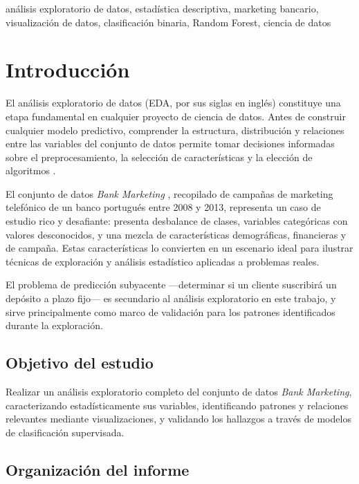 \documentclass[conference]{IEEEtran}
\begin{document}
\begin{IEEEkeywords}
análisis exploratorio de datos, estadística descriptiva, marketing bancario, visualización de datos, clasificación binaria, Random Forest, ciencia de datos
\end{IEEEkeywords}

\section{Introducción}

El análisis exploratorio de datos (EDA, por sus siglas en inglés) constituye una etapa fundamental en cualquier proyecto de ciencia de datos. Antes de construir cualquier modelo predictivo, comprender la estructura, distribución y relaciones entre las variables del conjunto de datos permite tomar decisiones informadas sobre el preprocesamiento, la selección de características y la elección de algoritmos \cite{tukey1977}.

El conjunto de datos \textit{Bank Marketing} \cite{uci_bank}, recopilado de campañas de marketing telefónico de un banco portugués entre 2008 y 2013, representa un caso de estudio rico y desafiante: presenta desbalance de clases, variables categóricas con valores desconocidos, y una mezcla de características demográficas, financieras y de campaña. Estas características lo convierten en un escenario ideal para ilustrar técnicas de exploración y análisis estadístico aplicadas a problemas reales.

El problema de predicción subyacente —determinar si un cliente suscribirá un depósito a plazo fijo— es secundario al análisis exploratorio en este trabajo, y sirve principalmente como marco de validación para los patrones identificados durante la exploración.

\subsection*{Objetivo del estudio}

Realizar un análisis exploratorio completo del conjunto de datos \textit{Bank Marketing}, caracterizando estadísticamente sus variables, identificando patrones y relaciones relevantes mediante visualizaciones, y validando los hallazgos a través de modelos de clasificación supervisada.

\subsection*{Organización del informe}
\end{document}
